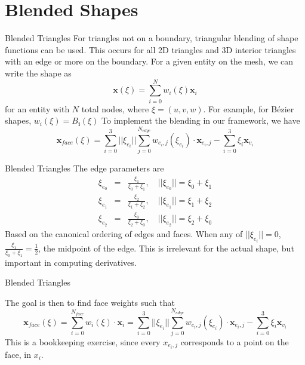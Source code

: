 \documentclass[12pt]{beamer}
\begin{document}
\section{Blended Shapes}
\begin{frame}{Blended Triangles}
For triangles not on a boundary, triangular blending of shape functions can be used. This occurs for all 2D triangles and 3D interior triangles with an edge or more on the boundary. For a given entity on the mesh, we can write the shape as
\[ \mathbf{x}(\xi) = \sum_{i=0}^N w_i(\xi) \mathbf{x}_i \]
for an entity with $N$ total nodes, where $\xi = (u,v,w)$. For example, for B{\'e}zier shapes, $w_i(\xi) = B_{\mathbf{i}}(\xi)$ To implement the blending in our framework, we have 
\[\mathbf{x}_{face}(\xi) = \sum_{i=0}^{3}||\xi_{e_i}||\sum_{j=0}^{N_{edge}}w_{e_i,j}(\xi_{e_i})\cdot\mathbf{x}_{e_i,j}- \sum_{i=0}^{3}\xi_i\mathbf{x}_{v_i}\]
\end{frame}
\begin{frame}{Blended Triangles}
The edge parameters are
\begin{eqnarray*} 
\xi_{e_0} & = & \frac{\xi_1}{\xi_0+\xi_1},\quad ||\xi_{e_0}|| = \xi_0+\xi_1 \\
\xi_{e_1} & = & \frac{\xi_2}{\xi_1+\xi_2},\quad ||\xi_{e_1}|| = \xi_1+\xi_2 \\
\xi_{e_2} & = & \frac{\xi_0}{\xi_2+\xi_0},\quad ||\xi_{e_2}|| = \xi_2+\xi_0 
\end{eqnarray*}
Based on the canonical ordering of edges and faces. When any of $||\xi_{e_i}|| = 0$, $\frac{\xi_1}{\xi_0+\xi_1} = \frac{1}{2}$, the midpoint of the edge. This is irrelevant for the actual shape, but important in computing derivatives.
\end{frame}
\begin{frame}{Blended Triangles}

The goal is then to find face weights such that \[\mathbf{x}_{face}(\xi) = \sum_{i=0}^{N_{face}} w_i(\xi) \cdot \mathbf{x}_i = \sum_{i=0}^{3}||\xi_{e_i}||\sum_{j=0}^{N_{edge}}w_{e_i,j}(\xi_{e_i})\cdot\mathbf{x}_{e_i,j}- \sum_{i=0}^{3}\xi_i\mathbf{x}_{v_i} \] 
This is a bookkeeping exercise, since every $x_{e_i,j}$ corresponds to a point on the face, in $x_i$. 
\end{frame}
\end{document}
